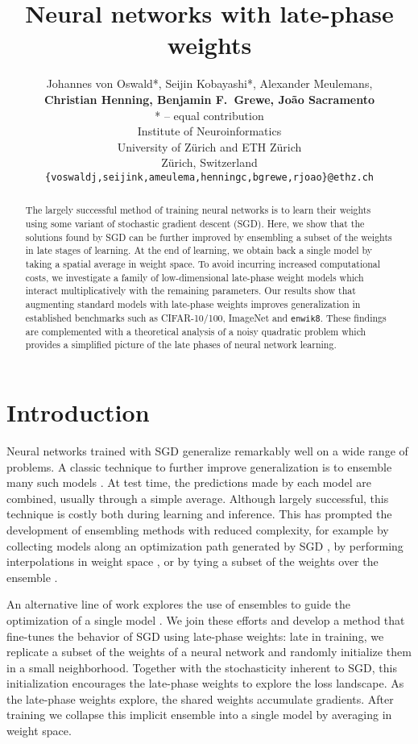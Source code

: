 \documentclass{article} \usepackage{iclr2021_conference,times}
\title{Neural networks with late-phase weights}
\author{Johannes von Oswald*, Seijin Kobayashi*, Alexander Meulemans,\\
\textbf{Christian Henning, Benjamin F.~Grewe, João Sacramento}\\
\vspace{0.5cm}
* -- equal contribution\\
Institute of Neuroinformatics\\
University of Zürich and ETH Zürich\\
Zürich, Switzerland\\
\texttt{\{voswaldj,seijink,ameulema,henningc,bgrewe,rjoao\}@ethz.ch}}
\begin{document}
\maketitle

\begin{abstract}
The largely successful method of training neural networks is to learn their weights using some variant of stochastic gradient descent (SGD). Here, we show that the solutions found by SGD can be further improved by ensembling a subset of the weights in late stages of learning. At the end of learning, we obtain back a single model by taking a spatial average in weight space. To avoid incurring increased computational costs, we investigate a family of low-dimensional late-phase weight models which interact multiplicatively with the remaining parameters. Our results show that augmenting standard models with late-phase weights improves generalization in established benchmarks such as CIFAR-10/100, ImageNet and \texttt{enwik8}. These findings are complemented with a theoretical analysis of a noisy quadratic problem which provides a simplified picture of the late phases of neural network learning.
\end{abstract}

\section{Introduction}

Neural networks trained with SGD generalize remarkably well on a wide range of problems. A classic technique to further improve generalization is to ensemble many such models \citep{lakshminarayanan_simple_2017}. At test time, the predictions made by each model are combined, usually through a simple average. Although largely successful, this technique is costly both during learning and inference. This has prompted the development of ensembling methods with reduced complexity, for example by collecting models along an optimization path generated by SGD \citep{huang_snapshot_2017}, by performing interpolations in weight space \citep{garipov_loss_2018}, or by tying a subset of the weights over the ensemble \citep{lee_why_2015,wen_batchensemble_2020}.

An alternative line of work explores the use of ensembles to guide the optimization of a single model \citep{zhang_deep_2015,pittorino_entropic_2020}. We join these efforts and develop a method that fine-tunes the behavior of SGD using late-phase weights: late in training, we replicate a subset of the weights of a neural network and randomly initialize them in a small neighborhood. Together with the stochasticity inherent to SGD, this initialization encourages the late-phase weights to explore the loss landscape. As the late-phase weights explore, the shared weights accumulate gradients. After training we collapse this implicit ensemble into a single model by averaging in weight space.
\end{document}
